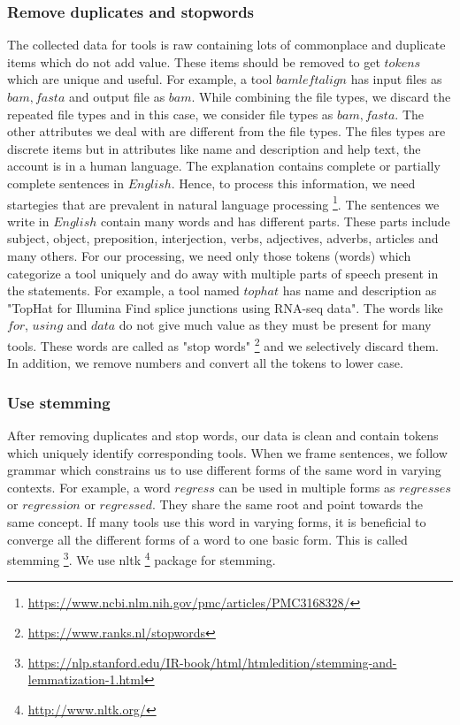 \subsubsection{Remove duplicates and stopwords}
    The collected data for tools is raw containing lots of commonplace and duplicate items which do not add value. These items should be removed to get $tokens$ which are unique and useful. For example, a tool $bamleftalign$ has input files as $bam, fasta$ and output file as $bam$. While combining the file types, we discard the repeated file types and in this case, we consider file types as $bam, fasta$. The other attributes we deal with are different from the file types. The files types are discrete items but in attributes like name and description and help text, the account is in a human language. The explanation contains complete or partially complete sentences in $English$. Hence, to process this information, we need startegies that are prevalent in natural language processing \footnote{\url{https://www.ncbi.nlm.nih.gov/pmc/articles/PMC3168328/}}. The sentences we write in $English$ contain many words and has different parts. These parts include subject, object, preposition, interjection, verbs, adjectives, adverbs, articles and many others. For our processing, we need only those tokens (words) which categorize a tool uniquely and do away with multiple parts of speech present in the statements. For example, a tool named $tophat$ has name and description as "TopHat for Illumina Find splice junctions using RNA-seq data". The words like $for$, $using$ and $data$ do not give much value as they must be present for many tools. These words are called as "stop words" \footnote{\url{https://www.ranks.nl/stopwords}} and we selectively discard them. In addition, we remove numbers and convert all the tokens to lower case.
   
\subsubsection{Use stemming}
After removing duplicates and stop words, our data is clean and contain tokens which uniquely identify corresponding tools. When we frame sentences, we follow grammar which constrains us to use different forms of the same word in varying contexts. For example, a word $regress$ can be used in multiple forms as $regresses$ or $regression$ or $regressed$. They share the same root and point towards the same concept. If many tools use this word in varying forms, it is beneficial to converge all the different forms of a word to one basic form. This is called stemming \footnote{\url{https://nlp.stanford.edu/IR-book/html/htmledition/stemming-and-lemmatization-1.html}}. We use nltk \footnote{\url{http://www.nltk.org/}} package for stemming.

